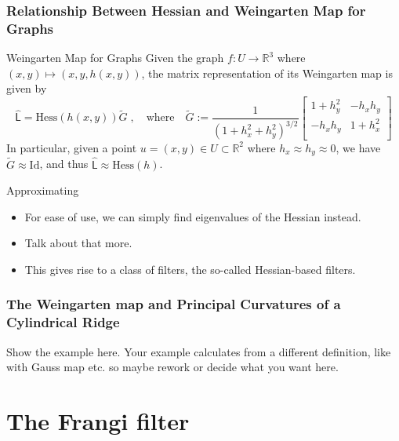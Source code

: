 \documentclass[9pt,notes]{beamer}
\begin{document}
\begin{frame}
\frametitle{Relationship Between Hessian and Weingarten Map for Graphs}
    \begin{block}{Weingarten Map for Graphs}
    Given the graph $f: U \to \mathbb{R}^3$ where $(x,y) \mapsto (x, y, h(x,y))$, the matrix
    representation of its Weingarten map is given by
    \begin{equation}
    \widehat{\mathsf{L}} = \mathrm{Hess}(h(x,y)) \tilde{G} \;,\quad \mathrm{where} \quad
    \tilde{G} := \frac{1}{\left({1+h_x^2 + h_y^2}\right)^{3/2}}
    \begin{bmatrix}
    1 + h_y^2 & -h_x h_y \\
    -h_x h_y & 1 + h_x^2 \\
    \end{bmatrix} 
    \end{equation}
    In particular, given a point $u = (x,y) \in U \subset \mathbb{R}^2$
    where $h_x \approx h_y \approx 0$, we
    have $\tilde{G} \approx \mathrm{Id}$, and thus
    $\widehat{\mathsf{L}} \approx \mathrm{Hess}(h)$.
  \end{block}
  \begin{block}{Approximating}
    \begin{itemize}
    \item For ease of use, we can simply find eigenvalues of the Hessian instead.
    \item Talk about that more.
    \item This gives rise to a class of filters, the so-called Hessian-based filters.
    \end{itemize}
  \end{block}
\end{frame}

\begin{frame}
  \frametitle{The Weingarten map and Principal Curvatures of a Cylindrical Ridge} 
Show the example here. Your example calculates from a different definition, like with Gauss map etc. so maybe rework or decide what you want here. 
\end{frame}


\section{The Frangi filter}
\end{document}
